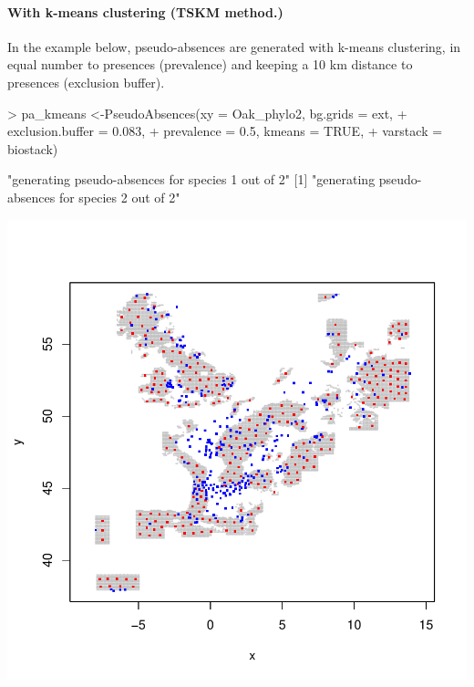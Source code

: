 \documentclass[10pt,a4paper]{article}
\begin{document}
\paragraph{With k-means clustering (TSKM method.)}

In the example below, pseudo-absences are generated with k-means clustering, in equal number to presences (prevalence) and keeping a 10 km distance to presences (exclusion buffer).

\begin{Schunk}
\begin{Sinput}
> pa_kmeans <-PseudoAbsences(xy = Oak_phylo2, bg.grids = ext, 
+                            exclusion.buffer = 0.083, 
+                            prevalence = 0.5, kmeans = TRUE, 
+                            varstack = biostack)
\end{Sinput}
\begin{Soutput}
[1] "generating pseudo-absences for species 1 out of 2"
[1] "generating pseudo-absences for species 2 out of 2"
\end{Soutput}
\end{Schunk}
\includegraphics{mopa-mopa10}
\end{document}
